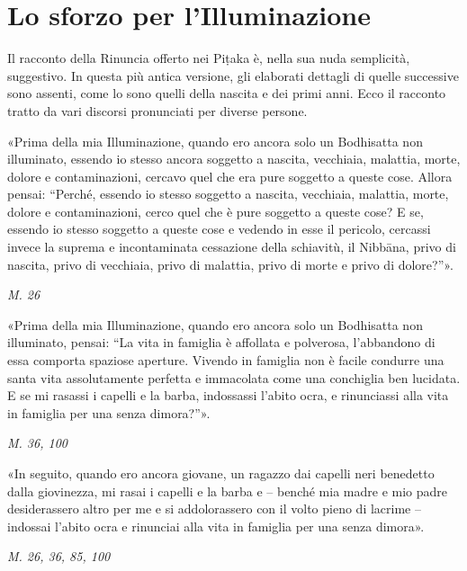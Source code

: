 \chapter{Lo sforzo per l'Illuminazione}

 Il racconto della Rinuncia offerto nei Piṭaka è, nella
sua nuda semplicità, suggestivo. In questa più antica versione, gli
elaborati dettagli di quelle successive sono assenti, come lo sono
quelli della nascita e dei primi anni. Ecco il racconto tratto da vari
discorsi pronunciati per diverse persone.


 «Prima della mia Illuminazione, quando ero ancora solo un
Bodhisatta non illuminato, essendo io stesso ancora soggetto a nascita,
vecchiaia, malattia, morte, dolore e contaminazioni, cercavo quel che
era pure soggetto a queste cose. Allora pensai: “Perché, essendo io
stesso soggetto a nascita, vecchiaia, malattia, morte, dolore e
contaminazioni, cerco quel che è pure soggetto a queste cose? E se,
essendo io stesso soggetto a queste cose e vedendo in esse il pericolo,
cercassi invece la suprema e incontaminata cessazione della schiavitù,
il Nibbāna, privo di nascita, privo di vecchiaia, privo di malattia,
privo di morte e privo di dolore?”».


\emph{M. 26}


«Prima della mia Illuminazione, quando ero ancora solo un Bodhisatta non
illuminato, pensai: “La vita in famiglia è affollata e polverosa,
l’abbandono di essa comporta spaziose aperture. Vivendo in famiglia non
è facile condurre una santa vita assolutamente perfetta e immacolata
come una conchiglia ben lucidata. E se mi rasassi i capelli e la barba,
indossassi l’abito ocra, e rinunciassi alla vita in famiglia per una
senza dimora?”».


\emph{M. 36, 100}


«In seguito, quando ero ancora giovane, un ragazzo dai capelli neri
benedetto dalla giovinezza, mi rasai i capelli e la barba e – benché mia
madre e mio padre desiderassero altro per me e si addolorassero con il
volto pieno di lacrime – indossai l’abito ocra e rinunciai alla vita in
famiglia per una senza dimora».


\emph{M. 26, 36, 85, 100}


